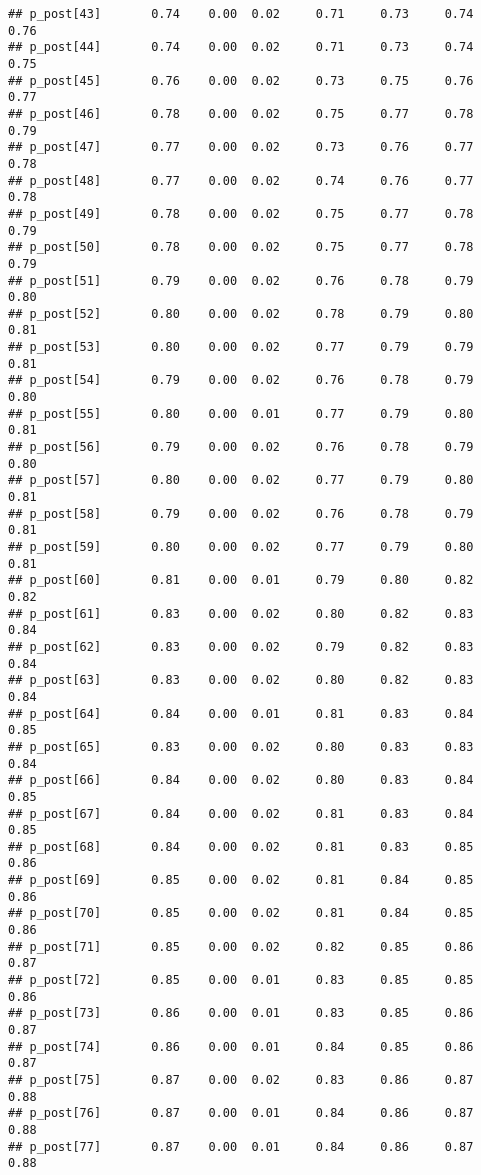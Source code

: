 \documentclass{article}\usepackage[]{graphicx}\usepackage[]{color}
\makeatletter
\newenvironment{kframe}{%
 \def\at@end@of@kframe{}%
 \ifinner\ifhmode%
  \def\at@end@of@kframe{\end{minipage}}%
  \begin{minipage}{\columnwidth}%
 \fi\fi%
 \def\FrameCommand##1{\hskip\@totalleftmargin \hskip-\fboxsep
 \colorbox{shadecolor}{##1}\hskip-\fboxsep
     \hskip-\linewidth \hskip-\@totalleftmargin \hskip\columnwidth}%
 \MakeFramed {\advance\hsize-\width
   \@totalleftmargin\z@ \linewidth\hsize
   \@setminipage}}%
 {\par\unskip\endMakeFramed%
 \at@end@of@kframe}
\newenvironment{knitrout}{}{} %
\makeatother
\begin{document}
\begin{knitrout}
\begin{kframe}
\begin{verbatim}
## p_post[43]       0.74    0.00  0.02     0.71     0.73     0.74     0.76
## p_post[44]       0.74    0.00  0.02     0.71     0.73     0.74     0.75
## p_post[45]       0.76    0.00  0.02     0.73     0.75     0.76     0.77
## p_post[46]       0.78    0.00  0.02     0.75     0.77     0.78     0.79
## p_post[47]       0.77    0.00  0.02     0.73     0.76     0.77     0.78
## p_post[48]       0.77    0.00  0.02     0.74     0.76     0.77     0.78
## p_post[49]       0.78    0.00  0.02     0.75     0.77     0.78     0.79
## p_post[50]       0.78    0.00  0.02     0.75     0.77     0.78     0.79
## p_post[51]       0.79    0.00  0.02     0.76     0.78     0.79     0.80
## p_post[52]       0.80    0.00  0.02     0.78     0.79     0.80     0.81
## p_post[53]       0.80    0.00  0.02     0.77     0.79     0.79     0.81
## p_post[54]       0.79    0.00  0.02     0.76     0.78     0.79     0.80
## p_post[55]       0.80    0.00  0.01     0.77     0.79     0.80     0.81
## p_post[56]       0.79    0.00  0.02     0.76     0.78     0.79     0.80
## p_post[57]       0.80    0.00  0.02     0.77     0.79     0.80     0.81
## p_post[58]       0.79    0.00  0.02     0.76     0.78     0.79     0.81
## p_post[59]       0.80    0.00  0.02     0.77     0.79     0.80     0.81
## p_post[60]       0.81    0.00  0.01     0.79     0.80     0.82     0.82
## p_post[61]       0.83    0.00  0.02     0.80     0.82     0.83     0.84
## p_post[62]       0.83    0.00  0.02     0.79     0.82     0.83     0.84
## p_post[63]       0.83    0.00  0.02     0.80     0.82     0.83     0.84
## p_post[64]       0.84    0.00  0.01     0.81     0.83     0.84     0.85
## p_post[65]       0.83    0.00  0.02     0.80     0.83     0.83     0.84
## p_post[66]       0.84    0.00  0.02     0.80     0.83     0.84     0.85
## p_post[67]       0.84    0.00  0.02     0.81     0.83     0.84     0.85
## p_post[68]       0.84    0.00  0.02     0.81     0.83     0.85     0.86
## p_post[69]       0.85    0.00  0.02     0.81     0.84     0.85     0.86
## p_post[70]       0.85    0.00  0.02     0.81     0.84     0.85     0.86
## p_post[71]       0.85    0.00  0.02     0.82     0.85     0.86     0.87
## p_post[72]       0.85    0.00  0.01     0.83     0.85     0.85     0.86
## p_post[73]       0.86    0.00  0.01     0.83     0.85     0.86     0.87
## p_post[74]       0.86    0.00  0.01     0.84     0.85     0.86     0.87
## p_post[75]       0.87    0.00  0.02     0.83     0.86     0.87     0.88
## p_post[76]       0.87    0.00  0.01     0.84     0.86     0.87     0.88
## p_post[77]       0.87    0.00  0.01     0.84     0.86     0.87     0.88

\end{verbatim}
\end{kframe}
\end{knitrout}
\end{document}
